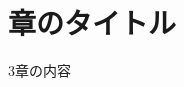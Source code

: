 \documentclass[main]{subfiles}
\begin{document}
\section{章のタイトル}
3章の内容
\\
\\
\\
\\
\\
\\
\\
\\
\end{document}
